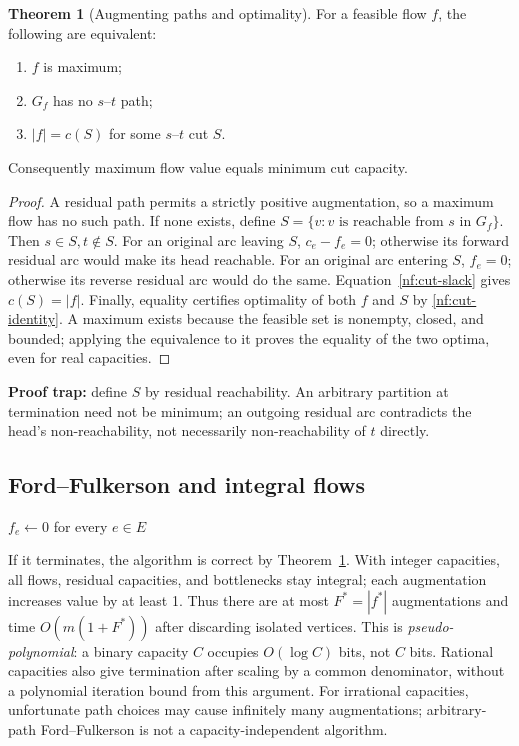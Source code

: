 \documentclass[10pt]{article}
\theoremstyle{definition}
\newtheorem{theorem}[definition]{Theorem}
\begin{document}
\begin{theorem}[Augmenting paths and optimality]\label{nf:mfmc}
For a feasible flow $f$, the following are equivalent:
\begin{enumerate}
 \item $f$ is maximum;
 \item $G_f$ has no $s$--$t$ path;
 \item $|f|=c(S)$ for some $s$--$t$ cut $S$.
\end{enumerate}
Consequently maximum flow value equals minimum cut capacity.
\end{theorem}
\begin{proof}
A residual path permits a strictly positive augmentation, so a maximum flow
has no such path. If none exists, define
$S=\{v:v\text{ is reachable from }s\text{ in }G_f\}$.
Then $s\in S,t\notin S$. For an original arc leaving $S$, $c_e-f_e=0$;
otherwise its forward residual arc would make its head reachable.
For an original arc entering $S$, $f_e=0$; otherwise its reverse residual arc
would do the same. Equation~\eqref{nf:cut-slack} gives $c(S)=|f|$.
Finally, equality certifies optimality of both $f$ and $S$ by
\eqref{nf:cut-identity}. A maximum exists because the feasible set is nonempty,
closed, and bounded; applying the equivalence to it proves the equality of
the two optima, even for real capacities.
\end{proof}
\textbf{Proof trap:} define $S$ by residual reachability. An arbitrary partition
at termination need not be minimum; an outgoing residual arc contradicts the
head's non-reachability, not necessarily non-reachability of $t$ directly.

\subsection{Ford--Fulkerson and integral flows}\label{nf:ff}

\begin{algorithm}[H]
\caption{Ford--Fulkerson: arbitrary residual augmenting paths}
$f_e\gets0$ for every $e\in E$\;
\;
\end{algorithm}
If it terminates, the algorithm is correct by Theorem~\ref{nf:mfmc}.
With integer capacities, all flows, residual capacities, and bottlenecks stay
integral; each augmentation increases value by at least 1. Thus there are at
most $F^*=|f^*|$ augmentations and time $O(m(1+F^*))$ after discarding isolated
vertices. This is \emph{pseudo-polynomial}: a binary capacity $C$ occupies
$O(\log C)$ bits, not $C$ bits. Rational capacities also give termination after
scaling by a common denominator, without a polynomial iteration bound from
this argument. For irrational capacities, unfortunate path choices may cause
infinitely many augmentations; arbitrary-path Ford--Fulkerson is not a
capacity-independent algorithm.
\end{document}
